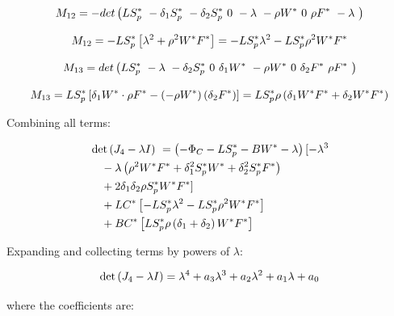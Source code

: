 \documentclass[10pt]{NSP1}
\newcommand{\fitwidth}[1]{\resizebox{\ifdim\width>\linewidth\linewidth\else\width\fi}{!}{#1}}
\begin{document}
\[
\fitwidth{$\displaystyle M_{12} = - det\left( LS_{p}^{*}\  - \delta_{1}S_{p}^{*}\  - \delta_{2}S_{p}^{*}\ 0\  - \lambda\  - \rho W^{*}\ 0\ \rho F^{*}\  - \lambda\  \right)$}
\]

\[
\fitwidth{$\displaystyle M_{12} = - LS_{p}^{*}\left\lbrack \lambda^{2} + \rho^{2}W^{*}F^{*} \right\rbrack = - LS_{p}^{*}\lambda^{2} - LS_{p}^{*}\rho^{2}W^{*}F^{*}$}
\]

\[
\fitwidth{$\displaystyle M_{13} = det\left( LS_{p}^{*}\  - \lambda\  - \delta_{2}S_{p}^{*}\ 0\ \delta_{1}W^{*}\  - \rho W^{*}\ 0\ \delta_{2}F^{*}\ \rho F^{*}\  \right)$}
\]

\[
\fitwidth{$\displaystyle M_{13} = LS_{p}^{*}\left\lbrack \delta_{1}W^{*} \cdot \rho F^{*} - \left( - \rho W^{*} \right)\left( \delta_{2}F^{*} \right) \right\rbrack = LS_{p}^{*}\rho\left( \delta_{1}W^{*}F^{*} + \delta_{2}W^{*}F^{*} \right)$}
\]

Combining all terms:

\[
\fitwidth{$\displaystyle \begin{aligned}
&\det\left( J_{4} - \lambda I \right)\  = \left( - \Phi_{C} - LS_{p}^{*} - BW^{*} - \lambda \right)\lbrack - \lambda^{3} \\
&\quad - \lambda\left( \rho^{2}W^{*}F^{*} + \delta_{1}^{2}S_{p}^{*}W^{*} + \delta_{2}^{2}S_{p}^{*}F^{*} \right)\ \ \quad \\
&\quad + 2\delta_{1}\delta_{2}\rho S_{p}^{*}W^{*}F^{*}\rbrack\ \ \quad \\
&\quad + LC^{*}\left\lbrack - LS_{p}^{*}\lambda^{2} - LS_{p}^{*}\rho^{2}W^{*}F^{*} \right\rbrack\ \ \quad \\
&\quad + BC^{*}\left\lbrack LS_{p}^{*}\rho\left( \delta_{1} + \delta_{2} \right)W^{*}F^{*} \right\rbrack{}
\end{aligned}$}
\]

Expanding and collecting terms by powers of \(\lambda\):

\[
\fitwidth{$\displaystyle \det\left( J_{4} - \lambda I \right) = \lambda^{4} + a_{3}\lambda^{3} + a_{2}\lambda^{2} + a_{1}\lambda + a_{0}$}
\]

where the coefficients are:
\end{document}
